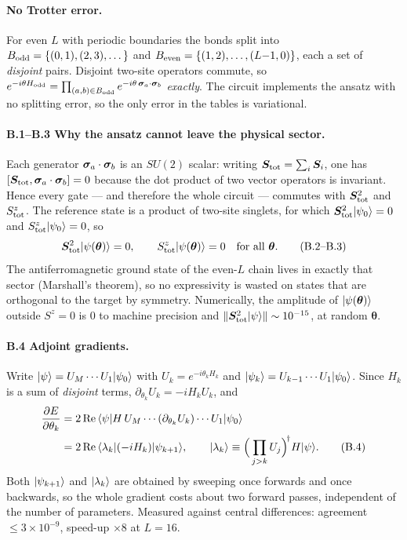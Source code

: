 \paragraph{No Trotter error.}
For even $L$ with periodic boundaries the bonds split into
$B_{\rm odd}=\{(0,1),(2,3),\dots\}$ and
$B_{\rm even}=\{(1,2),\dots,(L{-}1,0)\}$, each a set of \emph{disjoint} pairs.
Disjoint two-site operators commute, so
$e^{-i\theta H_{\rm odd}} = \prod_{(a,b)\in B_{\rm odd}} e^{-i\theta\,\bm{\sigma}_a\cdot\bm{\sigma}_b}$
\emph{exactly}. The circuit implements the ansatz with no splitting error, so
the only error in the tables is variational.

\paragraph{\textsf{B.1}--\textsf{B.3} Why the ansatz cannot leave the physical
sector.}
Each generator $\bm{\sigma}_a\cdot\bm{\sigma}_b$ is an $SU(2)$ scalar: writing
$\bm S_{\rm tot} = \sum_i \bm S_i$, one has
$[\bm S_{\rm tot}, \bm{\sigma}_a\cdot\bm{\sigma}_b]=0$ because the dot product of two
vector operators is invariant. Hence every gate --- and therefore the whole
circuit --- commutes with $\bm S_{\rm tot}^2$ and $S^z_{\rm tot}$. The
reference state is a product of two-site singlets, for which
$\bm S^2_{\rm tot}\lvert \psi_0 \rangle=0$ and $S^z_{\rm tot}\lvert \psi_0 \rangle=0$, so
\begin{equation}
  \bm S_{\rm tot}^2\lvert \psi(\bm\theta) \rangle = 0,\qquad
  S^z_{\rm tot}\lvert \psi(\bm\theta) \rangle = 0
  \quad\text{for all }\bm\theta .
  \tag{B.2--B.3}
\end{equation}
The antiferromagnetic ground state of the even-$L$ chain lives in exactly that
sector (Marshall's theorem), so no expressivity is wasted on states that are
orthogonal to the target by symmetry. Numerically, the amplitude of
$\lvert \psi(\bm\theta) \rangle$ outside $S^z=0$ is $0$ to machine precision and
$\|\bm S^2_{\rm tot}\lvert \psi \rangle\| \sim 10^{-15}$, at random $\bm\theta$.

\paragraph{\textsf{B.4} Adjoint gradients.}
Write $\lvert \psi \rangle = U_M \cdots U_1\lvert \psi_0 \rangle$ with $U_k = e^{-i\theta_k H_k}$
and $\lvert \psi_k \rangle = U_{k-1}\cdots U_1\lvert \psi_0 \rangle$. Since $H_k$ is a sum of
\emph{disjoint} terms, $\partial_{\theta_k}U_k = -iH_kU_k$, and
\begin{align}
  \frac{\partial E}{\partial\theta_k}
  &= 2\,\mathrm{Re}\,\langle \psi \rvert H\,U_M\cdots(\partial_{\theta_k}U_k)\cdots U_1\lvert \psi_0 \rangle
   \nonumber\\
  &= 2\,\mathrm{Re}\,\langle \lambda_k \rvert(-iH_k)\lvert \psi_{k+1} \rangle,
  \qquad
  \lvert \lambda_k \rangle \equiv \Big(\prod_{j>k}U_j\Big)^{\!\dagger} H \lvert \psi \rangle.
  \tag{B.4}
\end{align}
Both $\lvert \psi_{k+1} \rangle$ and $\lvert \lambda_k \rangle$ are obtained by sweeping once
forwards and once backwards, so the whole gradient costs about two forward
passes, independent of the number of parameters. Measured against central
differences: agreement $\le 3\times10^{-9}$, speed-up $\times 8$ at $L=16$.

